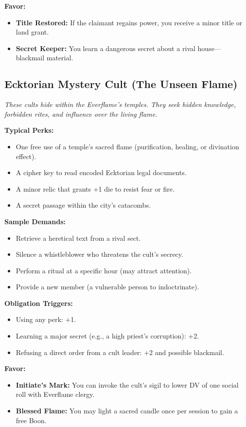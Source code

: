 \textbf{Favor:}
\begin{itemize}
  \item \textbf{Title Restored:} If the claimant regains power, you receive a minor title or land grant.
  \item \textbf{Secret Keeper:} You learn a dangerous secret about a rival house—blackmail material.
\end{itemize}

\subsection{Ecktorian Mystery Cult (The Unseen Flame)}

\textit{These cults hide within the Everflame’s temples. They seek hidden knowledge, forbidden rites, and influence over the living flame.}

\textbf{Typical Perks:}
\begin{itemize}
  \item One free use of a temple’s sacred flame (purification, healing, or divination effect).
  \item A cipher key to read encoded Ecktorian legal documents.
  \item A minor relic that grants +1 die to resist fear or fire.
  \item A secret passage within the city’s catacombs.
\end{itemize}

\textbf{Sample Demands:}
\begin{itemize}
  \item Retrieve a heretical text from a rival sect.
  \item Silence a whistleblower who threatens the cult’s secrecy.
  \item Perform a ritual at a specific hour (may attract attention).
  \item Provide a new member (a vulnerable person to indoctrinate).
\end{itemize}

\textbf{Obligation Triggers:}
\begin{itemize}
  \item Using any perk: +1.
  \item Learning a major secret (e.g., a high priest’s corruption): +2.
  \item Refusing a direct order from a cult leader: +2 and possible blackmail.
\end{itemize}

\textbf{Favor:}
\begin{itemize}
  \item \textbf{Initiate’s Mark:} You can invoke the cult’s sigil to lower DV of one social roll with Everflame clergy.
  \item \textbf{Blessed Flame:} You may light a sacred candle once per session to gain a free Boon.
\end{itemize}

